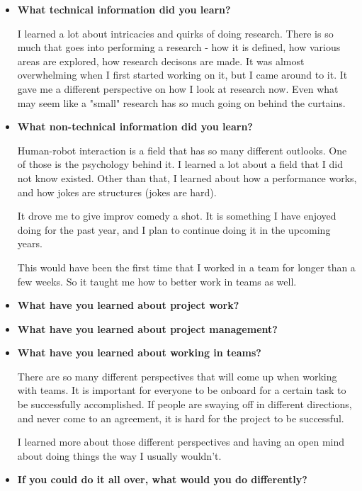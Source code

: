 \documentclass[onecolumn, draftclsnofoot,10pt, compsoc]{IEEEtran}
\begin{document}
\begin{itemize}
\item{\textbf{What technical information did you learn?}}

    I learned a lot about intricacies and quirks of doing research. There is so much that goes into performing a research - 
    how it is defined, how various areas are explored, how research decisons are made. It was almost overwhelming when I first
    started working on it, but I came around to it. It gave me a different perspective on how I look at research now.
    Even what may seem like a "small" research has so much going on behind the curtains.

\item{\textbf{What non-technical information did you learn?}}

    Human-robot interaction is a field that has so many different outlooks. One of those is the psychology behind it.
    I learned a lot about a field that I did not know existed. Other than that, I learned about how a performance works,
    and how jokes are structures (jokes are hard). 

    It drove me to give improv comedy a shot. It is something I have enjoyed doing for the past year, and I plan to continue
    doing it in the upcoming years.

    This would have been the first time that I worked in a team for longer than a few weeks. So it taught me how to better work
    in teams as well.

\item{\textbf{What have you learned about project work?}}



\item{\textbf{What have you learned about project management?}}


\item{\textbf{What have you learned about working in teams?}}

    There are so many different perspectives that will come up when working with teams. It is important for everyone to be
    onboard for a certain task to be successfully accomplished. If people are swaying off in different directions, 
    and never come to an agreement, it is hard for the project to be successful.

    I learned more about those different perspectives and having an open mind about doing things the way I usually wouldn't.


\item{\textbf{If you could do it all over, what would you do differently?}}

    
\end{itemize}
\end{document}

